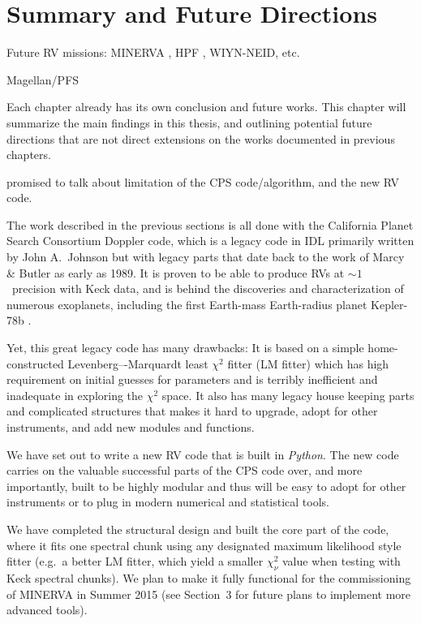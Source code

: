 \chapter{Summary and Future Directions}\label{chap:conclusion}


Future RV missions: MINERVA \cite{minerva}, HPF
\cite{2012SPIE.8446E..1SM}, WIYN-NEID, etc.

Magellan/PFS \cite{2010SPIE.7735E..53C}


Each chapter already has its own conclusion and future works. This
chapter will summarize the main findings in this thesis, and outlining
potential future directions that are not direct extensions on the
works documented in previous chapters.

promised to talk about limitation of the CPS code/algorithm, and the
new RV code.

The work described in the previous sections is all done with the
California Planet Search Consortium Doppler code, which is a legacy
code in IDL primarily written by John A.\ Johnson but with legacy
parts that date back to the work of Marcy \& Butler as early as
1989. It is proven to be able to produce RVs at $\sim 1$
\mps\ precision with Keck data, and is behind the discoveries and
characterization of numerous exoplanets, including the first
Earth-mass Earth-radius planet Kepler-78b \citep{howard2013,pepe2013}.

Yet, this great legacy code has many drawbacks: It is based on a
simple home-constructed Levenberg–-Marquardt least $\chi^2$ fitter
(LM fitter) which has high requirement on initial guesses for
parameters and is terribly inefficient and inadequate in exploring the
$\chi^2$ space. It also has many legacy house keeping parts and
complicated structures that makes it hard to upgrade, adopt for other
instruments, and add new modules and functions.

We have set out to write a new RV code that is built in {\it Python}.
The new code carries on the valuable successful parts of the CPS code
over, and more importantly, built to be highly modular and thus will
be easy to adopt for other instruments or to plug in modern
numerical and statistical tools.

We have completed the structural design and built the core part of the
code, where it fits one spectral chunk using any designated maximum
likelihood style fitter (e.g.\ a better LM fitter, which yield a
smaller $\chi^2_\nu$ value when testing with Keck spectral chunks). We
plan to make it fully functional for the commissioning of MINERVA in
Summer 2015 (see Section~3 for future plans to implement more
advanced tools).


